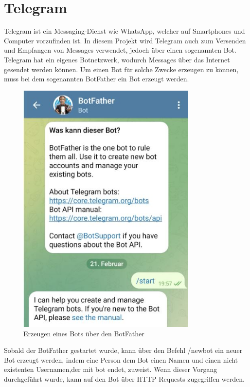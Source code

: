 \section{Telegram}
Telegram ist ein Messaging-Dienst wie WhatsApp, welcher auf Smartphones und Computer vorzufinden ist.
In diesem Projekt wird Telegram auch zum Versenden und Empfangen von Messages verwendet, jedoch über einen sogenannten Bot.
Telegram hat ein eigenes Botnetzwerk, wodurch Messages über das Internet gesendet werden können.
Um einen Bot für solche Zwecke erzeugen zu können, muss bei dem sogenannten BotFather ein Bot erzeugt werden.

\begin{figure}[H]
    \centering
    \includegraphics[width=0.8\textwidth]{./pics/BotFather.JPG}
    \caption{Erzeugen eines Bots über den BotFather}
\end{figure}

Sobald der BotFather gestartet wurde, kann über den Befehl /newbot ein neuer Bot erzeugt 
werden, indem eine Person dem Bot einen Namen und einen nicht existenten Usernamen,der mit bot endet, zuweist.
Wenn dieser Vorgang durchgeführt wurde, kann auf den Bot über HTTP Requests zugegriffen werden.

